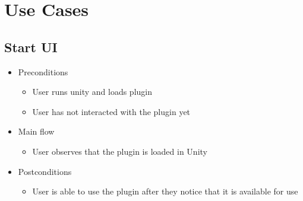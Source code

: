 \section{Use Cases}
\subsection{Start UI}
    \begin{itemize}
    \item Preconditions
        \begin{itemize}
            \item User runs unity and loads plugin
            \item User has not interacted with the plugin yet
        \end{itemize}
    \end{itemize}
    \begin{itemize}
        \item Main flow
        \begin{itemize}
            \item User observes that the plugin is loaded in Unity
        \end{itemize}
    \end{itemize}
    \begin{itemize}
        \item Postconditions
        \begin{itemize}
            \item User is able to use the plugin after they notice that it is available for use
        \end{itemize}
    \end{itemize}
